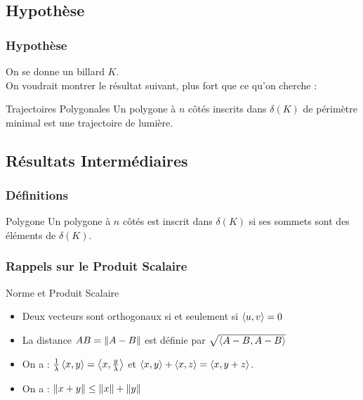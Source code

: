 \documentclass{beamercours}
\begin{document}
\subsection{Hypothèse}
\begin{frame}
\frametitle{Hypothèse}
On se donne un billard $K$.\\
On voudrait montrer le résultat suivant, plus fort que ce qu'on cherche :
\begin{théorème}{Trajectoires Polygonales}{}
Un polygone à $n$ côtés inscrits dans $\delta(K)$ de périmètre minimal est une trajectoire de lumière.
\end{théorème}
\end{frame}

\subsection{Résultats Intermédiaires}
\begin{frame}
\frametitle{Définitions}
\vspace{-5pt}
\begin{définition}{Polygone}{}
Un polygone à $n$ côtés est inscrit dans $\delta(K)$ si ses sommets sont des éléments de $\delta(K)$.\\
\end{définition}
\end{frame}
\begin{frame}
    \frametitle{Rappels sur le Produit Scalaire}
    \begin{propositionfr}{Norme et Produit Scalaire}{}
        \begin{itemize}[<+->]
            \item Deux vecteurs sont orthogonaux si et seulement si $\left\langle u, v \right\rangle = 0$
            \item La distance $AB = \left\lVert A - B \right\rVert$ est définie par $\sqrt{\left\langle A - B, A - B \right\rangle}$ 
            \item On a : $\frac{1}{\lambda} \left\langle x, y \right\rangle = \left\langle x, {y \over \lambda} \right\rangle$ et $\left\langle x, y \right\rangle + \left\langle x, z \right\rangle = \left\langle x, y + z \right\rangle$.
            \item On a : $\left\lVert x + y \right\rVert \leq \left\lVert x \right\rVert + \left\lVert y \right\rVert$
        \end{itemize}
    \end{propositionfr}
\end{frame}
\end{document}
